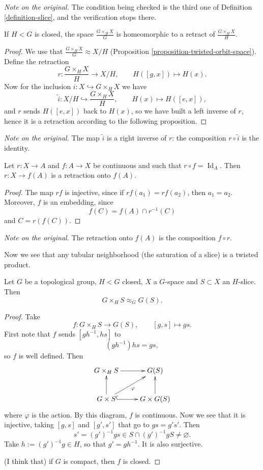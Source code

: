 \noindent
{\it Note on the original.} The
condition being checked is the third
one of
Definition \ref{definition-slice}, and
the verification stops there.

\begin{proposition}
\label{proposition-retract-of-orbit-space}
If $H<G$ is closed, the space
$\frac{G\times_HX}{G}$ is homeomorphic
to a retract of $\frac{G\times_HX}{H}$.
\end{proposition}

\begin{proof}
We use that
$\frac{G\times_HX}{G}\approx X/H$
(Proposition
\ref{proposition-twisted-orbit-space}).
Define the retraction
$$
r:\frac{G\times_HX}{H}\to X/H,
\qquad
H([g,x])\mapsto H(x).
$$
Now for the inclusion
$i:X\hookrightarrow G\times_HX$ we have
$$
\tilde{i}:X/H
\hookrightarrow\frac{G\times_HX}{H},
\qquad
H(x)\mapsto H([e,x]),
$$
and $r$ sends $H([e,x])$ back to
$H(x)$, so we have built a left inverse
of $r$, hence it is a retraction
according to the following proposition.
\end{proof}

\noindent
{\it Note on the original.} The map
$\tilde{i}$ is a right inverse of $r$:
the composition $r\circ\tilde{i}$ is
the identity.

\begin{proposition}
\label{proposition-retraction-onto-image}
Let $r:X\to A$ and $f:A\to X$ be
continuous and such that
$r\circ f=\operatorname{Id}_A$. Then
$r:X\to f(A)$ is a retraction onto
$f(A)$.
\end{proposition}

\begin{proof}
The map $rf$ is injective, since if
$rf(a_1)=rf(a_2)$, then $a_1=a_2$.
Moreover, $f$ is an embedding, since
$$
f(C)=f(A)\cap r^{-1}(C)
$$
and $C=r(f(C))$.
\end{proof}

\noindent
{\it Note on the original.} The
retraction onto $f(A)$ is the
composition $f\circ r$.

Now we see that any tubular
neighborhood (the saturation of a
slice) is a twisted product.

\begin{theorem}
\label{theorem-tube-is-twisted-product}
Let $G$ be a topological group, $H<G$
closed, $X$ a $G$-space and
$S\subset X$ an $H$-slice. Then
$$
G\times_HS\approx_GG(S).
$$
\end{theorem}

\begin{proof}
Take
$$
f:G\times_HS\to G(S),
\qquad
[g,s]\mapsto gs.
$$
First note that $f$ sends
$[gh^{-1},hs]$ to
$$
(gh^{-1})hs=gs,
$$
so $f$ is well defined. Then
$$
\xymatrix{
G\times_HS \ar[r] & G(S) \\
G\times S \ar[u] \ar[ur]_{\varphi}
  \ar@{^{(}->}[r]
  & G\times G(S) \ar[u]
}
$$
where $\varphi$ is the action. By this
diagram, $f$ is continuous. Now we see
that it is injective, taking $[g,s]$
and $[g',s']$ that go to $gs=g's'$.
Then
$$
s'=(g')^{-1}gs
\in S\cap(g')^{-1}gS
\neq\varnothing.
$$
Take $h:=(g')^{-1}g\in H$, so that
$g'=gh^{-1}$. It is also surjective.

(I think that) if $G$ is compact, then
$f$ is closed.
\end{proof}

